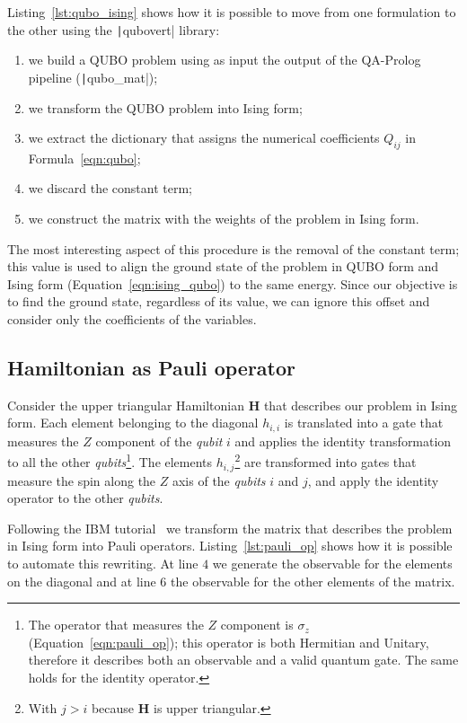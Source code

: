 Listing~\ref{lst:qubo_ising} shows how it is possible to move from one formulation to the other using the \texttt|qubovert| library:
\begin{enumerate}
	\item we build a QUBO problem using as input the output of the QA-Prolog pipeline (\texttt|qubo_mat|);
	\item we transform the QUBO problem into Ising form;
	\item we extract the dictionary that assigns the numerical coefficients $Q_{ij}$ in Formula~\ref{eqn:qubo};
	\item we discard the constant term;
	\item we construct the matrix with the weights of the problem in Ising form.
\end{enumerate}
The most interesting aspect of this procedure is the removal of the constant term; this value is used to align the ground state of the problem in QUBO form and Ising form (Equation~\ref{eqn:ising_qubo}) to the same energy. Since our objective is to find the ground state, regardless of its value, we can ignore this offset and consider only the coefficients of the variables.

\subsection{Hamiltonian as Pauli operator}
Consider the upper triangular Hamiltonian $\mathbf{H}$ that describes our problem in Ising form. Each element belonging to the diagonal $h_{i,i}$ is translated into a gate that measures the $Z$ component of the \emph{qubit} $i$ and applies the identity transformation to all the other \emph{qubits}\footnote{The operator that measures the $Z$ component is $\sigma_z$ (Equation~\ref{eqn:pauli_op}); this operator is both Hermitian and Unitary, therefore it describes both an observable and a valid quantum gate. The same holds for the identity operator.}. The elements $h_{i,j}$\footnote{With $j>i$ because $\mathbf{H}$ is upper triangular.} are transformed into gates that measure the spin along the $Z$ axis of the \emph{qubits} $i$ and $j$, and apply the identity operator to the other \emph{qubits}. 

Following the IBM tutorial~\cite{ibm_qaoa_tutorial} we transform the matrix that describes the problem in Ising form into Pauli operators. Listing~\ref{lst:pauli_op} shows how it is possible to automate this rewriting. At line $4$ we generate the observable for the elements on the diagonal and at line $6$ the observable for the other elements of the matrix.
\begin{listing}[h]
	\caption{Genearating Pauli operator}
	\label{lst:pauli_op}
\end{listing}

